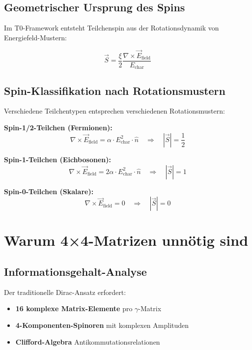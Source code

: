 \documentclass[12pt,a4paper]{report}
\begin{document}
	\subsection{Geometrischer Ursprung des Spins}
	\label{subsec:geometric_spin}
	
	Im T0-Framework entsteht Teilchenspin aus der Rotationsdynamik von Energiefeld-Mustern:
	
	\begin{equation}
		\vec{S} = \frac{\xi}{2} \frac{\nabla \times \vec{E}_{\text{field}}}{E_{\text{char}}}
		\label{eq:spin_energy_field}
	\end{equation}
	
	\subsection{Spin-Klassifikation nach Rotationsmustern}
	\label{subsec:spin_classification}
	
	Verschiedene Teilchentypen entsprechen verschiedenen Rotationsmustern:
	
	\textbf{Spin-1/2-Teilchen (Fermionen):}
	\begin{equation}
		\nabla \times \vec{E}_{\text{field}} = \alpha \cdot E_{\text{char}}^2 \cdot \hat{n} \quad \Rightarrow \quad |\vec{S}| = \frac{1}{2}
	\end{equation}
	
	\textbf{Spin-1-Teilchen (Eichbosonen):}
	\begin{equation}
		\nabla \times \vec{E}_{\text{field}} = 2\alpha \cdot E_{\text{char}}^2 \cdot \hat{n} \quad \Rightarrow \quad |\vec{S}| = 1
	\end{equation}
	
	\textbf{Spin-0-Teilchen (Skalare):}
	\begin{equation}
		\nabla \times \vec{E}_{\text{field}} = 0 \quad \Rightarrow \quad |\vec{S}| = 0
	\end{equation}
	
	\section{Warum 4×4-Matrizen unnötig sind}
	\label{sec:matrix_elimination_justification}
	
	\subsection{Informationsgehalt-Analyse}
	\label{subsec:information_content}
	
	Der traditionelle Dirac-Ansatz erfordert:
	\begin{itemize}
		\item \textbf{16 komplexe Matrix-Elemente} pro $\gamma$-Matrix
		\item \textbf{4-Komponenten-Spinoren} mit komplexen Amplituden
		\item \textbf{Clifford-Algebra} Antikommutationsrelationen
	\end{itemize}
	
\end{document}
